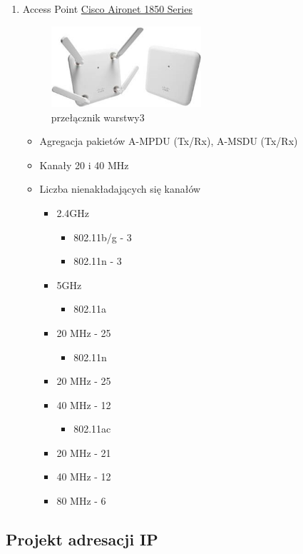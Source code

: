 \documentclass{article}
\begin{document}
\begin{enumerate}
	\item Access Point
	\href{ https://www.cisco.com/c/en/us/products/collateral/wireless/aironet-1850-series-access-points/datasheet-c78-734256.html}{Cisco Aironet 1850 Series}
		\begin{figure}[!ht]	
		\centering
		\includegraphics[height=3cm]{5.jpg}
		\caption{przełącznik warstwy3}
		\label{fig:obrazek 6}
	\end{figure}
	\begin{itemize}
		\item Agregacja pakietów A-MPDU (Tx/Rx), A-MSDU (Tx/Rx)
		\item Kanały 20 i 40 MHz
		\item Liczba nienakładających się kanałów
		\begin{itemize}
			\item 2.4GHz
			\begin{itemize}
			\item 802.11b/g - 3
			\item 802.11n - 3
			\end{itemize}
			\item 5GHz
			\begin{itemize}
				\item 802.11a 
			\end{itemize}
		\item 20 MHz - 25
		\begin{itemize}
			\item 802.11n
		\end{itemize}
		\item 20 MHz - 25
		\item 40 MHz - 12
		\begin{itemize}
			\item 802.11ac
		\end{itemize}
		\item 20 MHz - 21
		\item 40 MHz - 12
		\item 80 MHz - 6
		\end{itemize}
	\end{itemize}
\end{enumerate}
\newpage
\subsection{Projekt adresacji IP}
\end{document}
